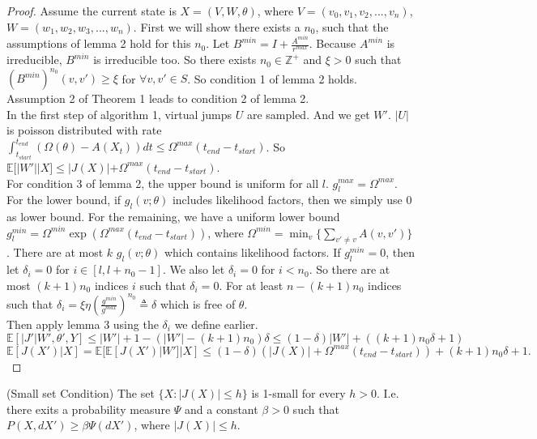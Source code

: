\begin{proof}
Assume the current state is $X = (V, W, \theta)$, where $V = (v_0, v_1, v_2,..., v_n)$, $W = (w_1, w_2, w_3,..., w_n)$. First we will show there exists a $n_0$, such that the assumptions of lemma 2 hold for this $n_0$. Let $B^{min} = I + \frac{A^{min}}{r^{max}}$. Because $A^{min}$ is irreducible, $B^{min}$ is irreducible too. So there exists $n_0 \in \mathbb{Z}^+$ and $\xi > 0$ such that $(B^{min})^{n_0}(v, v') \geq \xi$ for $\forall v, v' \in S$. So condition 1 of lemma 2 holds. Assumption 2 of Theorem 1 leads to condition 2 of lemma 2. \\
In the first step of algorithm 1, virtual jumps $U$ are sampled. And we get $W'$. $|U|$ is poisson distributed with rate $\int_{t_{start}}^{t_{end}}(\Omega(\theta) - A(X_t))dt \leq \Omega^{max}(t_{end} - t_{start})$. So $\mathbb{E}[|W'| | X] \leq |J(X)| + \Omega^{max}(t_{end} - t_{start})$.\\For condition 3 of lemma 2, the upper bound is uniform for all $l$. $g_l^{max} = \Omega^{max}$. For the lower bound, if $g_l(v; 
\theta)$ includes likelihood factors, then we simply use $0$ as lower bound. For the remaining, we have a uniform lower bound $g_l^{min} = \Omega^{min} \exp(\Omega^{max}(t_{end} - t_{start}))$, where $\Omega^{min} = \min_{v}\{ \sum_{v' \neq v} A(v, v')\}$. There are at most $k$  $g_l(v; \theta)$ which contains likelihood factors. If $g_l^{min} = 0$, then let $\delta_i = 0$ for $i \in [l, l + n_0 - 1]$. We also let $\delta_i = 0$ for $ i < n_0$. So there are at most $(k + 1) n_0$ indices $i$ such that $\delta_i = 0$. For at least $n - (k + 1)n_0$ indices such that $\delta_i = \xi \eta (\frac{g^{min}}{g^{max}})^{n_0} \triangleq \delta$ which is free of $\theta$.\\ 
Then apply lemma 3 using the $\delta_i$ we define earlier. $\mathbb{E}[|J'| W', \theta', Y] \leq |W'| + 1 - (|W'| - (k + 1) n_0) \delta \leq (1 - \delta) |W'| + ((k + 1)n_0\delta + 1)$\\
$$\mathbb{E}[J(X') | X] = \mathbb{E}[\mathbb{E}[J(X')| W'] | X] \leq (1- \delta)(|J(X)| + \Omega^{max}(t_{end} - t_{start})) + (k + 1)n_0\delta + 1.$$
\end{proof}
\begin{proposition}
  (Small set Condition)  The set $\{ X: |J(X)| \leq h \}$ is 1-small for every $h > 0$. I.e. there exits a probability measure $\Psi$ and a constant $\beta > 0$ such that $P(X, dX') \geq \beta \Psi(dX')$, where $|J(X)| \leq h$.
\end{proposition}
